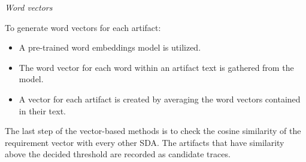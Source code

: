 \pagebreak

\textit{Word vectors}

To generate word vectors for each artifact:

\begin{itemize}
    \item A pre-trained word embeddings model is utilized.
    \item The word vector for each word within an artifact text is gathered from the model.
    \item A vector for each artifact is created by averaging the word vectors contained in their text.
\end{itemize}


The last step of the vector-based methods is to check the cosine similarity of the requirement vector with every other SDA. The artifacts that have similarity above the decided threshold are recorded as candidate traces.


